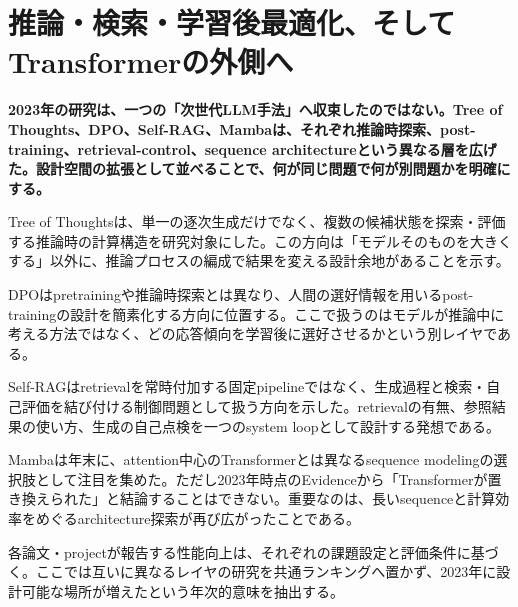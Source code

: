 \section{推論・検索・学習後最適化、そしてTransformerの外側へ}
\noindent\textbf{2023年の研究は、一つの「次世代LLM手法」へ収束したのではない。Tree of Thoughts、DPO、Self-RAG、Mambaは、それぞれ推論時探索、post-training、retrieval-control、sequence architectureという異なる層を広げた。設計空間の拡張として並べることで、何が同じ問題で何が別問題かを明確にする。}\autocite{src-21aef0026892,src-5dd64e15cc75,src-8a38211129c4,src-e413c7ab8da4}

Tree of Thoughtsは、単一の逐次生成だけでなく、複数の候補状態を探索・評価する推論時の計算構造を研究対象にした。この方向は「モデルそのものを大きくする」以外に、推論プロセスの編成で結果を変える設計余地があることを示す。\autocite{src-8a38211129c4}


DPOはpretrainingや推論時探索とは異なり、人間の選好情報を用いるpost-trainingの設計を簡素化する方向に位置する。ここで扱うのはモデルが推論中に考える方法ではなく、どの応答傾向を学習後に選好させるかという別レイヤである。\autocite{src-21aef0026892}


Self-RAGはretrievalを常時付加する固定pipelineではなく、生成過程と検索・自己評価を結び付ける制御問題として扱う方向を示した。retrievalの有無、参照結果の使い方、生成の自己点検を一つのsystem loopとして設計する発想である。\autocite{src-e413c7ab8da4}


Mambaは年末に、attention中心のTransformerとは異なるsequence modelingの選択肢として注目を集めた。ただし2023年時点のEvidenceから「Transformerが置き換えられた」と結論することはできない。重要なのは、長いsequenceと計算効率をめぐるarchitecture探索が再び広がったことである。\autocite{src-5dd64e15cc75}


\begin{claimboundary}
各論文・projectが報告する性能向上は、それぞれの課題設定と評価条件に基づく。ここでは互いに異なるレイヤの研究を共通ランキングへ置かず、2023年に設計可能な場所が増えたという年次的意味を抽出する。\autocite{src-8a38211129c4}
\end{claimboundary}
